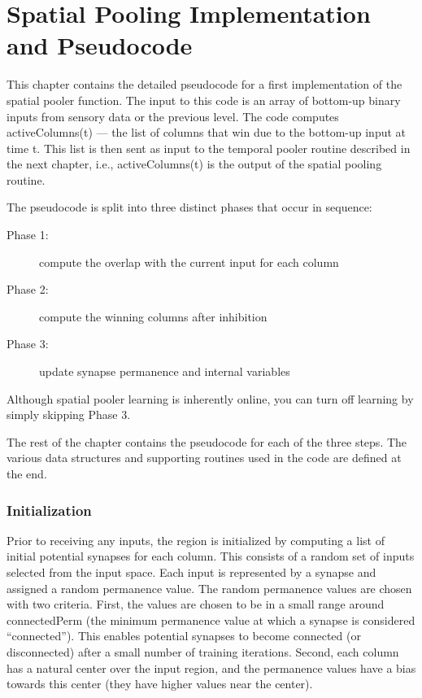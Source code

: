 \documentclass{report}
\begin{document}
\chapter{Spatial Pooling Implementation and Pseudocode}
\label{chapter:spatial-pooling}

This chapter contains the detailed pseudocode for a first
implementation of the spatial pooler function. The input to this code
is an array of bottom-up binary inputs from sensory data or the
previous level. The code computes activeColumns(t) --- the list of
columns that win due to the bottom-up input at time t. This list is
then sent as input to the temporal pooler routine described in the
next chapter, i.e., activeColumns(t) is the output of the spatial
pooling routine.

The pseudocode is split into three distinct phases that occur in
sequence:

\begin{description}
\item[Phase 1:] compute the overlap with the current input for each column
\item[Phase 2:] compute the winning columns after inhibition
\item[Phase 3:] update synapse permanence and internal variables
\end{description}

Although spatial pooler learning is inherently online, you can turn
off learning by simply skipping Phase 3.

The rest of the chapter contains the pseudocode for each of the three
steps. The various data structures and supporting routines used in the
code are defined at the end.

\subsection*{Initialization}

Prior to receiving any inputs, the region is initialized by computing
a list of initial potential synapses for each column. This consists of
a random set of inputs selected from the input space. Each input is
represented by a synapse and assigned a random permanence value. The
random permanence values are chosen with two criteria. First, the
values are chosen to be in a small range around connectedPerm (the
minimum permanence value at which a synapse is considered
``connected''). This enables potential synapses to become connected (or
disconnected) after a small number of training iterations. Second,
each column has a natural center over the input region, and the
permanence values have a bias towards this center (they have higher
values near the center).
\end{document}
